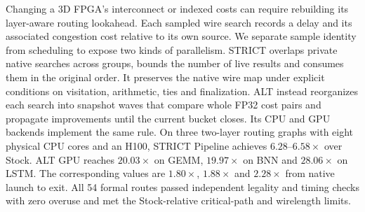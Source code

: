 Changing a 3D FPGA's interconnect or indexed costs can require rebuilding its layer-aware routing lookahead. Each sampled wire search records a delay and its associated congestion cost relative to its own source. We separate sample identity from scheduling to expose two kinds of parallelism. STRICT overlaps private native searches across groups, bounds the number of live results and consumes them in the original order. It preserves the native wire map under explicit conditions on visitation, arithmetic, ties and finalization. ALT instead reorganizes each search into snapshot waves that compare whole FP32 cost pairs and propagate improvements until the current bucket closes. Its CPU and GPU backends implement the same rule. On three two-layer routing graphs with eight physical CPU cores and an H100, STRICT Pipeline achieves $6.28$--$6.58\times$ \constructionspeedup{} over Stock. ALT GPU reaches $20.03\times$ on GEMM, $19.97\times$ on BNN and $28.06\times$ on LSTM. The corresponding \processspeedup{} values are $1.80\times$, $1.88\times$ and $2.28\times$ from native launch to exit. All 54 formal routes passed independent legality and timing checks with zero overuse and met the Stock-relative critical-path and wirelength limits.
